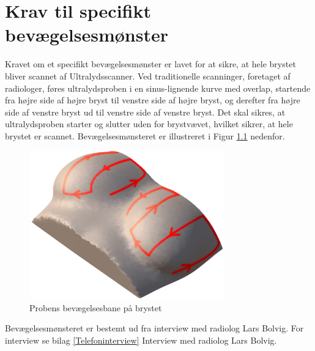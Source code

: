 \chapter{Krav til specifikt bevægelsesmønster} \label{Monster}
Kravet om et specifikt bevægelsesmønster er lavet for at sikre, at hele brystet bliver scannet af Ultralydsscanner. Ved traditionelle scanninger, foretaget af radiologer, føres ultralydsproben i en sinus-lignende kurve med overlap, startende fra højre side af højre bryst til venstre side af højre bryst, og derefter fra højre side af venstre bryst ud til venstre side af venstre bryst. Det skal sikres, at ultralydsproben starter og slutter uden for brystvævet, hvilket sikrer, at hele brystet er scannet. Bevægelsesmønsteret er illustreret i Figur \ref{Probensbevagelse} nedenfor. 

\begin{figure}[H]
    \centering
    \includegraphics[width=0.75\textwidth]{figurer/d/probebevagelse}
    \caption{Probens bevægelsesbane på brystet}
    \label{Probensbevagelse}
\end{figure}

Bevægelsesmønsteret er bestemt ud fra interview med radiolog Lars Bolvig. For interview se bilag \ref{Telefoninterview} Interview med radiolog Lars Bolvig. 